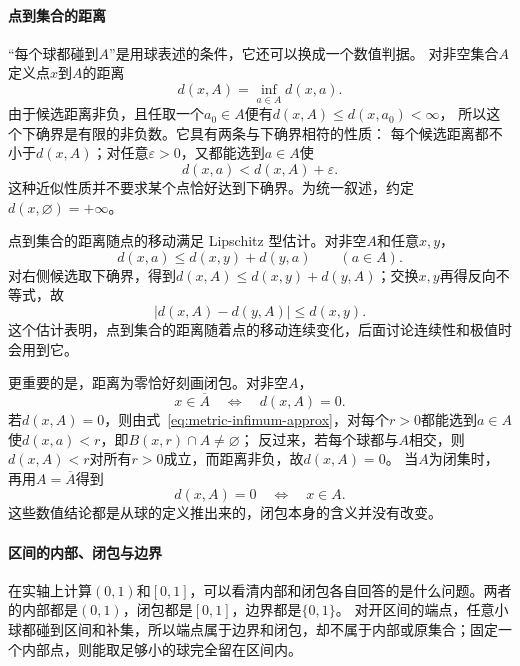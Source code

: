 \paragraph{点到集合的距离}

“每个球都碰到$A$”是用球表述的条件，它还可以换成一个数值判据。
对非空集合$A$定义点$x$到$A$的距离
\begin{equation}
\label{eq:metric-distance-to-set}
  d(x,A)=\inf_{a\in A}d(x,a).
\end{equation}
由于候选距离非负，且任取一个$a_0\in A$便有$d(x,A)\leq d(x,a_0)<\infty$，
所以这个下确界是有限的非负数。它具有两条与下确界相符的性质：
每个候选距离都不小于$d(x,A)$；对任意$\varepsilon>0$，又都能选到$a\in A$使
\begin{equation}
\label{eq:metric-infimum-approx}
  d(x,a)<d(x,A)+\varepsilon.
\end{equation}
这种近似性质并不要求某个点恰好达到下确界。为统一叙述，约定$d(x,\varnothing)=+\infty$。

点到集合的距离随点的移动满足 Lipschitz 型估计。对非空$A$和任意$x,y$，
\[
  d(x,a)\leq d(x,y)+d(y,a)\qquad(a\in A).
\]
对右侧候选取下确界，得到$d(x,A)\leq d(x,y)+d(y,A)$；交换$x,y$再得反向不等式，故
\begin{equation}
\label{eq:metric-set-distance-lipschitz}
  \bigl|d(x,A)-d(y,A)\bigr|\leq d(x,y).
\end{equation}
这个估计表明，点到集合的距离随着点的移动连续变化，后面讨论连续性和极值时会用到它。

更重要的是，距离为零恰好刻画闭包。对非空$A$，
\begin{equation}
\label{eq:metric-zero-distance-closure}
  x\in\overline A\quad\Longleftrightarrow\quad d(x,A)=0.
\end{equation}
若$d(x,A)=0$，则由式~\eqref{eq:metric-infimum-approx}，对每个$r>0$都能选到$a\in A$使$d(x,a)<r$，即$B(x,r)\cap A\neq\varnothing$；
反过来，若每个球都与$A$相交，则$d(x,A)<r$对所有$r>0$成立，而距离非负，故$d(x,A)=0$。
当$A$为闭集时，再用$A=\overline A$得到
\[
  d(x,A)=0\quad\Longleftrightarrow\quad x\in A.
\]
这些数值结论都是从球的定义推出来的，闭包本身的含义并没有改变。

\paragraph{区间的内部、闭包与边界}

在实轴上计算$(0,1)$和$[0,1]$，可以看清内部和闭包各自回答的是什么问题。两者的内部都是$(0,1)$，闭包都是$[0,1]$，边界都是$\{0,1\}$。
对开区间的端点，任意小球都碰到区间和补集，所以端点属于边界和闭包，却不属于内部或原集合；固定一个内部点，则能取足够小的球完全留在区间内。


